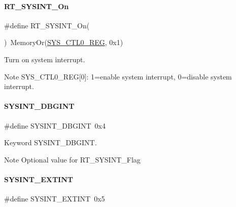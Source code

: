 \paragraph{\texorpdfstring{R\+T\+\_\+\+S\+Y\+S\+I\+N\+T\+\_\+\+On}{RT\_SYSINT\_On}}
{\footnotesize\ttfamily \#define R\+T\+\_\+\+S\+Y\+S\+I\+N\+T\+\_\+\+On(\begin{DoxyParamCaption}{ }\end{DoxyParamCaption})~Memory\+Or(\mbox{\hyperlink{a00020_ab34acec79daf4fcc12a662cde9e75df7}{S\+Y\+S\+\_\+\+C\+T\+L0\+\_\+\+R\+EG}}, 0x1)}



Turn on system interrupt. 

\begin{DoxyNote}{Note}
S\+Y\+S\+\_\+\+C\+T\+L0\+\_\+\+R\+EG\mbox{[}0\mbox{]}\+: 1=enable system interrupt, 0=disable system interrupt. 
\end{DoxyNote}
\mbox{\label{a00011_a9abec7bef84c5bc3310714d05e1138dc}} 
\paragraph{\texorpdfstring{S\+Y\+S\+I\+N\+T\+\_\+\+D\+B\+G\+I\+NT}{SYSINT\_DBGINT}}
{\footnotesize\ttfamily \#define S\+Y\+S\+I\+N\+T\+\_\+\+D\+B\+G\+I\+NT~0x4}



Keyword S\+Y\+S\+I\+N\+T\+\_\+\+D\+B\+G\+I\+NT. 

\begin{DoxyNote}{Note}
Optional value for R\+T\+\_\+\+S\+Y\+S\+I\+N\+T\+\_\+\+Flag 
\end{DoxyNote}
\mbox{\label{a00011_a76cdcef76b44ff2f2125afcf05158f00}} 
\paragraph{\texorpdfstring{S\+Y\+S\+I\+N\+T\+\_\+\+E\+X\+T\+I\+NT}{SYSINT\_EXTINT}}
{\footnotesize\ttfamily \#define S\+Y\+S\+I\+N\+T\+\_\+\+E\+X\+T\+I\+NT~0x5}



